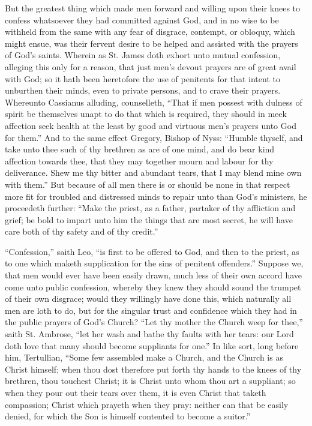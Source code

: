 But the greatest thing which made men forward and willing upon their knees to confess whatsoever they had committed against God, and in no wise to be withheld from the same with any fear of disgrace, contempt, or obloquy, which might ensue, was their fervent desire to be helped and assisted with the prayers of God’s saints. Wherein as St. James doth exhort unto mutual confession, alleging this only for a reason, that just men’s devout prayers are of great avail with God; so it hath been heretofore the use of penitents for that intent to unburthen their minds, even to private persons, and to crave their prayers. Whereunto Cassianus alluding, counselleth, “That if men possest with dulness of spirit be themselves unapt to do that which is required, they should in meek affection seek health at the least by good and virtuous men’s prayers unto God for them.” And to the same effect Gregory, Bishop of Nyss: “Humble thyself, and take unto thee such of thy brethren as are of one mind, and do bear kind affection towards thee, that they may together mourn and labour for thy deliverance. Shew me thy bitter and abundant tears, that I may blend mine own with them.” But because of all men there is or should be none in that respect more fit for troubled and distressed minds to repair unto than God’s ministers, he proceedeth further: “Make the priest, as a father, partaker of thy affliction and grief; be bold to impart unto him the things that are most secret, he will have care both of thy safety and of thy credit.”


“Confession,” saith Leo, “is first to be offered to God, and then to the priest, as to one which maketh supplication for the sins of penitent offenders.” Suppose we, that men would ever have been easily drawn, much less of their own accord have come unto public confession, whereby they knew they should sound the trumpet of their own disgrace; would they willingly have done this, which naturally all men are loth to do, but for the singular trust and confidence which they had in the public prayers of God’s Church? “Let thy mother the Church weep for thee,” saith St. Ambrose, “let her wash and bathe thy faults with her tears: our Lord doth love that many should become suppliants for one.” In like sort, long before him, Tertullian, “Some few assembled make a Church, and the Church is as Christ himself; when thou dost therefore put forth thy hands to the knees of thy brethren, thou touchest Christ; it is Christ unto whom thou art a suppliant; so when they pour out their tears over them, it is even Christ that taketh compassion; Christ which prayeth when they pray: neither can that be easily denied, for which the Son is himself contented to become a suitor.”

